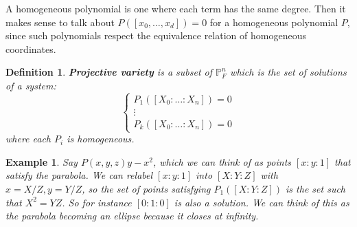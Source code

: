 \documentclass[12pt]{article}
\renewcommand{\P}{\mathbb{P}}
\newtheorem{definition}{Definition}
\newtheorem{example}[]{Example}
\begin{document}
    A homogeneous polynomial is one where each term has the same degree. Then it makes sense to talk about $P([x_0, \dots, x_d]) = 0$ for a homogeneous polynomial $P$, since such polynomials respect the equivalence relation of homogeneous coordinates. 
    \begin{definition}
        \textbf{Projective variety} is a subset of $\P_F^n$ which is the set of solutions of a system:
        $$\begin{cases}
            P_1([X_0: \dots : X_n]) = 0 \\ 
            \vdots \\
            P_k([X_0: \dots : X_n]) = 0
        \end{cases}$$
        where each $P_i$ is homogeneous. 
    \end{definition}
    \begin{example}
        Say $P(x, y, z) y - x^2$, which we can think of as points $[x:y:1]$ that satisfy the parabola. We can relabel $[x:y:1]$ into $[X:Y:Z]$ with $x = X/Z, y = Y/Z$, so the set of points satisfying $P_1([X:Y:Z])$ is the set such that $X^2 = YZ$. So for instance $[0:1:0]$ is also a solution. We can think of this as the parabola becoming an ellipse because it closes at infinity. 
    \end{example}
\end{document}
